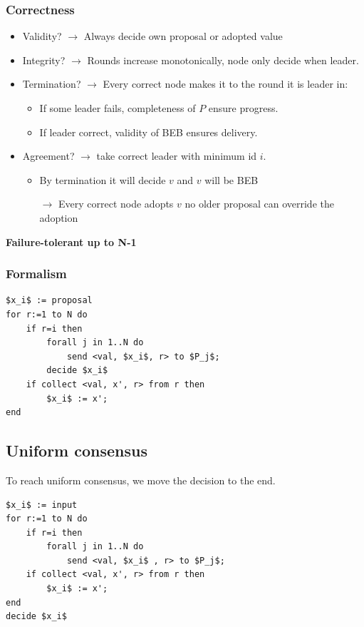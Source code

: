 \subsubsection{Correctness}
\begin{itemize}
	\item Validity? $\to$ Always decide own proposal or adopted value
	\item Integrity? $\to$ Rounds increase monotonically, node only
	decide when leader.
	\item Termination? $\to$ Every correct node makes it to the round it
	is leader in:
	\begin{itemize}
		\item If some leader fails, completeness of $P$ ensure progress.
		\item If leader correct, validity of BEB ensures delivery.
	\end{itemize}
	\item Agreement? $\to$ take correct leader with minimum id $i$.
        \begin{itemize}
            \item By termination it will decide $v$ and $v$ will be BEB
            \item[$\to$] Every correct node adopts $v$ no older proposal
                can override the adoption
        \end{itemize}
\end{itemize}

\textbf{Failure-tolerant up to N-1}

\subsubsection{Formalism}
\begin{lstlisting}[caption={Hierarchical consensus}, mathescape]
$x_i$ := proposal
for r:=1 to N do
    if r=i then
        forall j in 1..N do
            send <val, $x_i$, r> to $P_j$;
        decide $x_i$
    if collect <val, x', r> from r then
        $x_i$ := x';
end
\end{lstlisting}

\subsection{Uniform consensus}
To reach uniform consensus, we move the decision to the end.

\begin{lstlisting}[caption={Uniform Hierarchical consensus with P}, mathescape]
$x_i$ := input
for r:=1 to N do
    if r=i then
        forall j in 1..N do
            send <val, $x_i$ , r> to $P_j$;
    if collect <val, x', r> from r then
        $x_i$ := x';
end
decide $x_i$
\end{lstlisting}

